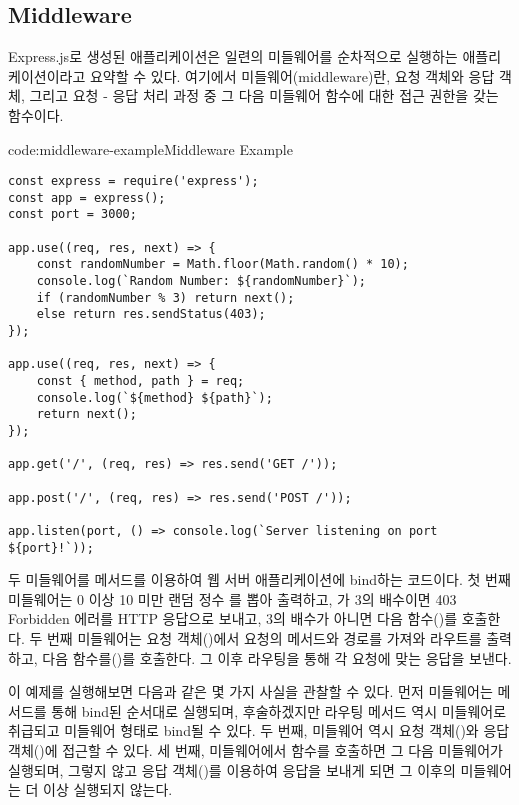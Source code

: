 \subsection*{Middleware}

Express.js로 생성된 애플리케이션은 일련의 미들웨어를 순차적으로 실행하는 애플리케이션이라고 요약할 수 있다. 여기에서 미들웨어(middleware)란, 요청 객체와 응답 객체, 그리고 요청 - 응답 처리 과정 중 그 다음 미들웨어 함수에 대한 접근 권한을 갖는 함수이다.

\begin{codeenv}{code:middleware-example}{Middleware Example}\begin{verbatim}
const express = require('express');
const app = express();
const port = 3000;

app.use((req, res, next) => {
    const randomNumber = Math.floor(Math.random() * 10);
    console.log(`Random Number: ${randomNumber}`);
    if (randomNumber % 3) return next();
    else return res.sendStatus(403);
});

app.use((req, res, next) => {
    const { method, path } = req;
    console.log(`${method} ${path}`);
    return next();
});

app.get('/', (req, res) => res.send('GET /'));

app.post('/', (req, res) => res.send('POST /'));

app.listen(port, () => console.log(`Server listening on port ${port}!`));
\end{verbatim}
\end{codeenv}

\은 두 미들웨어를  메서드를 이용하여 웹 서버 애플리케이션에 bind하는 코드이다. 첫 번째 미들웨어는 0 이상 10 미만 랜덤 정수 를 뽑아 출력하고, 가 3의 배수이면 403 Forbidden 에러를 HTTP 응답으로 보내고, 3의 배수가 아니면 다음 함수()를 호출한다. 두 번째 미들웨어는 요청 객체()에서 요청의 메서드와 경로를 가져와 라우트를 출력하고, 다음 함수를()를 호출한다. 그 이후 라우팅을 통해 각 요청에 맞는 응답을 보낸다.

이 예제를 실행해보면 다음과 같은 몇 가지 사실을 관찰할 수 있다. 먼저 미들웨어는  메서드를 통해 bind된 순서대로 실행되며, 후술하겠지만 라우팅 메서드 역시 미들웨어로 취급되고 미들웨어 형태로 bind될 수 있다. 두 번째, 미들웨어 역시 요청 객체()와 응답 객체()에 접근할 수 있다. 세 번째, 미들웨어에서  함수를 호출하면 그 다음 미들웨어가 실행되며, 그렇지 않고 응답 객체()를 이용하여 응답을 보내게 되면 그 이후의 미들웨어는 더 이상 실행되지 않는다.

